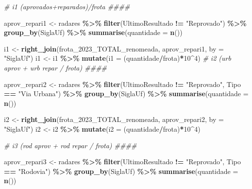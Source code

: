 \documentclass[
]{book}
\newenvironment{Shaded}{\begin{snugshade}}{\end{snugshade}}
\newcommand{\AttributeTok}[1]{\textcolor[rgb]{0.13,0.29,0.53}{#1}}
\newcommand{\CommentTok}[1]{\textcolor[rgb]{0.56,0.35,0.01}{\textit{#1}}}
\newcommand{\DecValTok}[1]{\textcolor[rgb]{0.00,0.00,0.81}{#1}}
\newcommand{\FunctionTok}[1]{\textcolor[rgb]{0.13,0.29,0.53}{\textbf{#1}}}
\newcommand{\NormalTok}[1]{#1}
\newcommand{\OtherTok}[1]{\textcolor[rgb]{0.56,0.35,0.01}{#1}}
\newcommand{\SpecialCharTok}[1]{\textcolor[rgb]{0.81,0.36,0.00}{\textbf{#1}}}
\newcommand{\StringTok}[1]{\textcolor[rgb]{0.31,0.60,0.02}{#1}}
\begin{document}
\begin{Shaded}
\begin{Highlighting}[]
\CommentTok{\# i1 (aprovados+reparados)/frota \#\#\#\#}

\NormalTok{aprov\_repari1 }\OtherTok{\textless{}{-}}\NormalTok{ radares }\SpecialCharTok{\%\textgreater{}\%} 
  \FunctionTok{filter}\NormalTok{(UltimoResultado }\SpecialCharTok{!=} \StringTok{"Reprovado"}\NormalTok{) }\SpecialCharTok{\%\textgreater{}\%} 
  \FunctionTok{group\_by}\NormalTok{(SiglaUf) }\SpecialCharTok{\%\textgreater{}\%} 
  \FunctionTok{summarise}\NormalTok{(}\AttributeTok{quantidade =} \FunctionTok{n}\NormalTok{())}

\NormalTok{i1 }\OtherTok{\textless{}{-}} \FunctionTok{right\_join}\NormalTok{(frota\_2023\_TOTAL\_renomeada, aprov\_repari1, }\AttributeTok{by =} \StringTok{"SiglaUf"}\NormalTok{)}
\NormalTok{i1 }\OtherTok{\textless{}{-}}\NormalTok{ i1 }\SpecialCharTok{\%\textgreater{}\%} 
  \FunctionTok{mutate}\NormalTok{(}\AttributeTok{i1 =}\NormalTok{ (quantidade}\SpecialCharTok{/}\NormalTok{frota)}\SpecialCharTok{*}\DecValTok{10}\SpecialCharTok{\^{}}\DecValTok{4}\NormalTok{)}
\CommentTok{\# i2 (urb aprov + urb repar / frota) \#\#\#\#}

\NormalTok{aprov\_repari2 }\OtherTok{\textless{}{-}}\NormalTok{ radares }\SpecialCharTok{\%\textgreater{}\%} 
  \FunctionTok{filter}\NormalTok{(UltimoResultado }\SpecialCharTok{!=} \StringTok{"Reprovado"}\NormalTok{,}
\NormalTok{         Tipo }\SpecialCharTok{==} \StringTok{"Via Urbana"}\NormalTok{) }\SpecialCharTok{\%\textgreater{}\%} 
  \FunctionTok{group\_by}\NormalTok{(SiglaUf) }\SpecialCharTok{\%\textgreater{}\%} 
  \FunctionTok{summarise}\NormalTok{(}\AttributeTok{quantidade =} \FunctionTok{n}\NormalTok{())}

\NormalTok{i2 }\OtherTok{\textless{}{-}} \FunctionTok{right\_join}\NormalTok{(frota\_2023\_TOTAL\_renomeada, aprov\_repari2, }\AttributeTok{by =} \StringTok{"SiglaUf"}\NormalTok{)}
\NormalTok{i2 }\OtherTok{\textless{}{-}}\NormalTok{ i2 }\SpecialCharTok{\%\textgreater{}\%} 
  \FunctionTok{mutate}\NormalTok{(}\AttributeTok{i2 =}\NormalTok{ (quantidade}\SpecialCharTok{/}\NormalTok{frota)}\SpecialCharTok{*}\DecValTok{10}\SpecialCharTok{\^{}}\DecValTok{4}\NormalTok{)}

\CommentTok{\# i3 (rod aprov + rod repar / frota) \#\#\#\#}

\NormalTok{aprov\_repari3 }\OtherTok{\textless{}{-}}\NormalTok{ radares }\SpecialCharTok{\%\textgreater{}\%} 
  \FunctionTok{filter}\NormalTok{(UltimoResultado }\SpecialCharTok{!=} \StringTok{"Reprovado"}\NormalTok{,}
\NormalTok{         Tipo }\SpecialCharTok{==} \StringTok{"Rodovia"}\NormalTok{) }\SpecialCharTok{\%\textgreater{}\%} 
  \FunctionTok{group\_by}\NormalTok{(SiglaUf) }\SpecialCharTok{\%\textgreater{}\%} 
  \FunctionTok{summarise}\NormalTok{(}\AttributeTok{quantidade =} \FunctionTok{n}\NormalTok{())}



\end{Highlighting}
\end{Shaded}
\end{document}
